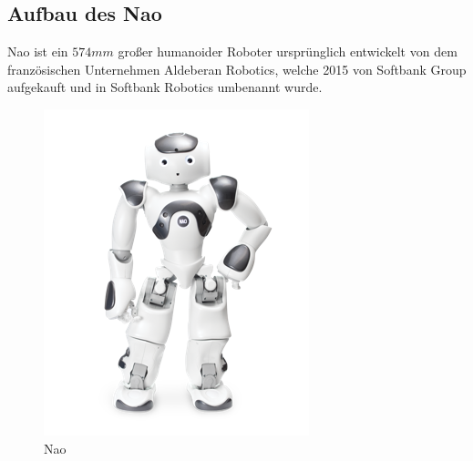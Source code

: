 \subsection{Aufbau des Nao}
Nao ist ein $574 \unit{mm}$ großer humanoider Roboter ursprünglich entwickelt von dem französischen Unternehmen Aldeberan Robotics, welche 2015 von Softbank Group aufgekauft \cite{aldebaran_to_softbank} und in Softbank Robotics umbenannt wurde. 

\begin{figure}
	\vspace{-0.5cm}
	\centering
	\includegraphics[width=\linewidth]{Bilder/naov6.png}
	\caption{Nao}
	\label{nao_v6}
	\vspace{-0,5cm}
\end{figure}

